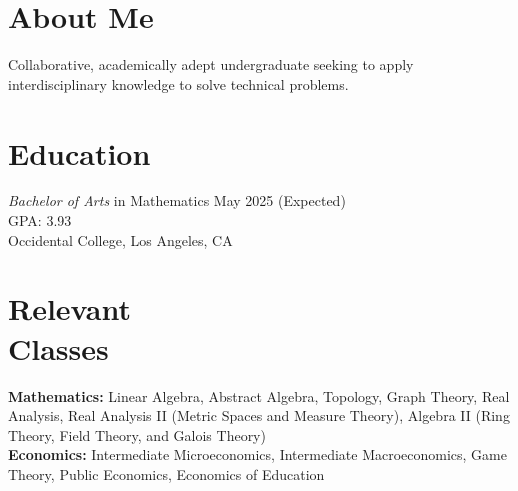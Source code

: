 \documentclass[margin, 12pt]{res} %
\begin{document}
\begin{resume}

\section{\sc About Me}
Collaborative, academically adept undergraduate seeking to apply interdisciplinary knowledge to solve technical problems.

\section{\sc Education}

{\sl Bachelor of Arts} in Mathematics \hfill May 2025 (Expected) \\
GPA: 3.93\\
Occidental College, Los Angeles, CA 
\section{\sc Relevant \\ Classes}

\textbf{Mathematics:} Linear Algebra, Abstract Algebra, Topology, Graph Theory, Real Analysis, Real Analysis II (Metric Spaces and Measure Theory), Algebra II (Ring Theory, Field Theory, and Galois Theory)\\
\textbf{Economics:} Intermediate Microeconomics, Intermediate Macroeconomics, Game Theory, Public Economics, Economics of Education

 

\end{resume}
\end{document}
